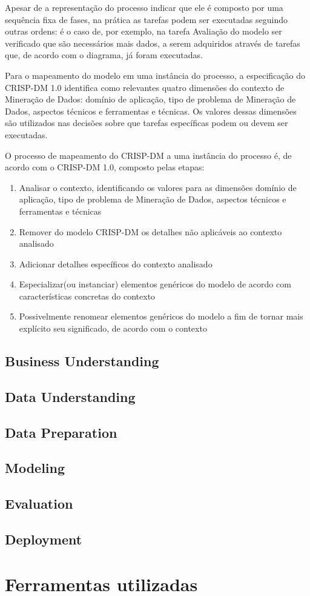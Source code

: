 Apesar de a representação do processo indicar que ele é composto por uma sequência fixa de fases, na prática as tarefas podem ser executadas seguindo outras ordens: é o caso de, por exemplo, na tarefa Avaliação do modelo ser verificado que são necessários mais dados, a serem adquiridos através de tarefas que, de acordo com o diagrama, já foram executadas.

Para o mapeamento do modelo em uma instância do processo, a especificação do CRISP-DM 1.0 identifica como relevantes quatro dimensões do contexto de Mineração de Dados: domínio de aplicação, tipo de problema de Mineração de Dados, aspectos técnicos e ferramentas e técnicas. Os valores dessas dimensões são utilizados nas decisões sobre que tarefas específicas podem ou devem ser executadas.

O processo de mapeamento do CRISP-DM a uma instância do processo é, de acordo com o CRISP-DM 1.0, composto pelas etapas:
\begin{enumerate}
\item Analisar o contexto, identificando os valores para as dimensões domínio de aplicação, tipo de problema de Mineração de Dados, aspectos técnicos e ferramentas e técnicas
\item Remover do modelo CRISP-DM os detalhes não aplicáveis ao contexto analisado
\item Adicionar detalhes específicos do contexto analisado
\item Especializar(ou instanciar) elementos genéricos do modelo de acordo com características concretas do contexto
\item Possivelmente renomear elementos genéricos do modelo a fim de tornar mais explícito seu significado, de acordo com o contexto
\end{enumerate}




\subsection*{Business Understanding}
\subsection*{Data Understanding}
\subsection*{Data Preparation}
\subsection*{Modeling}
\subsection*{Evaluation}
\subsection*{Deployment}

\section{Ferramentas utilizadas}